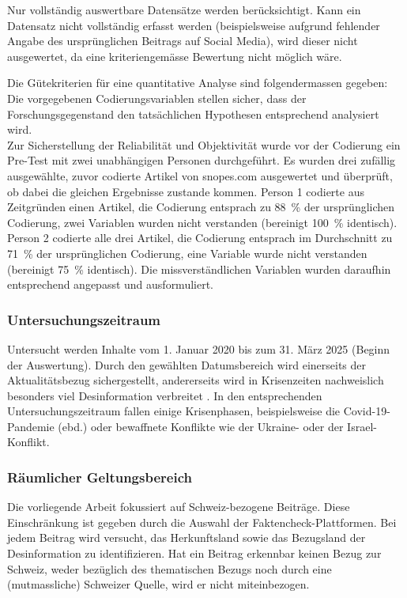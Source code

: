 \documentclass[12pt,a4paper]{article}        %
\begin{document}
Nur vollständig auswertbare Datensätze werden berücksichtigt. Kann ein Datensatz nicht vollständig erfasst werden (beispielsweise aufgrund fehlender Angabe des ursprünglichen Beitrags auf Social Media), wird dieser nicht ausgewertet, da eine kriteriengemässe Bewertung nicht möglich wäre.

Die Gütekriterien für eine quantitative Analyse sind folgendermassen gegeben: Die vorgegebenen Codierungsvariablen stellen sicher, dass der Forschungsgegenstand den tatsächlichen Hypothesen entsprechend analysiert wird.\\
Zur Sicherstellung der Reliabilität und Objektivität wurde vor der Codierung ein Pre-Test mit zwei unabhängigen Personen durchgeführt. Es wurden drei zufällig ausgewählte, zuvor codierte Artikel von snopes.com ausgewertet und überprüft, ob dabei die gleichen Ergebnisse zustande kommen. Person 1 codierte aus Zeitgründen einen Artikel, die Codierung entsprach zu 88~\% der ursprünglichen Codierung, zwei Variablen wurden nicht verstanden (bereinigt 100~\% identisch). Person 2 codierte alle drei Artikel, die Codierung entsprach im Durchschnitt zu 71~\% der ursprünglichen Codierung, eine Variable wurde nicht verstanden (bereinigt 75~\% identisch). Die missverständlichen Variablen wurden daraufhin entsprechend angepasst und ausformuliert.

\subsubsection{Untersuchungszeitraum}
Untersucht werden Inhalte vom 1. Januar 2020 bis zum 31. März 2025 (Beginn der Auswertung). Durch den gewählten Datumsbereich wird einerseits der Aktualitätsbezug sichergestellt, andererseits wird in Krisenzeiten nachweislich besonders viel Desinformation verbreitet \parencites{tandoc_jr_defining_2018}[Lim \& Ling (2018) zit.\ nach][2]{ceron_fake_2021}. In den entsprechenden Untersuchungszeitraum fallen einige Krisenphasen, beispielsweise die Covid-19-Pandemie (ebd.) oder bewaffnete Konflikte wie der Ukraine- oder der Israel-Konflikt.
\subsubsection{Räumlicher Geltungsbereich}
Die vorliegende Arbeit fokussiert auf Schweiz-bezogene Beiträge. Diese Einschränkung ist gegeben durch die Auswahl der Faktencheck-Plattformen. Bei jedem Beitrag wird versucht, das Herkunftsland sowie das Bezugsland der Desinformation zu identifizieren. Hat ein Beitrag erkennbar keinen Bezug zur Schweiz, weder bezüglich des thematischen Bezugs noch durch eine (mutmassliche) Schweizer Quelle, wird er nicht miteinbezogen.
\end{document}
